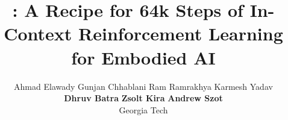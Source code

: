 \documentclass{article}
\title{\method: A Recipe for 64k Steps of In-Context Reinforcement Learning for Embodied AI}
\author{%
    Ahmad Elawady \quad
    Gunjan Chhablani \quad
    Ram Ramrakhya \quad
    Karmesh Yadav \quad \\
    \textbf{Dhruv Batra}  \quad
    \textbf{Zsolt Kira} \quad
    \textbf{Andrew Szot} \quad \\
    Georgia Tech 
}
\begin{document}
\maketitle

\begin{abstract}

\end{abstract}














\appendix
\newpage






\end{document}
